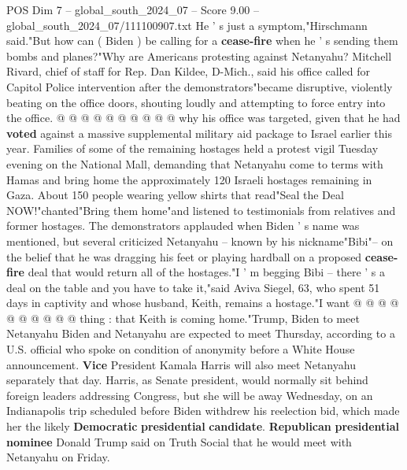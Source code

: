 \begin{textsample}{POS Dim 7 – global\_south\_2024\_07 – Score 9.00 – global\_south\_2024\_07/111100907.txt}
He ' s just a symptom,"Hirschmann said."But how can ( Biden ) be calling for a \textbf{cease-fire} when he ' s sending them bombs and planes?"Why are Americans protesting against Netanyahu?
Mitchell Rivard, chief of staff for Rep.
Dan Kildee, D-Mich., said his office called for Capitol Police intervention after the demonstrators"became disruptive, violently beating on the office doors, shouting loudly and attempting to force entry into the office. @ @ @ @ @ @ @ @ @ @ why his office was targeted, given that he had \textbf{voted} against a massive supplemental military aid package to Israel earlier this year.
Families of some of the remaining hostages held a protest vigil Tuesday evening on the National Mall, demanding that Netanyahu come to terms with Hamas and bring home the approximately 120 Israeli hostages remaining in Gaza.
About 150 people wearing yellow shirts that read"Seal the Deal NOW!"chanted"Bring them home"and listened to testimonials from relatives and former hostages.
The demonstrators applauded when Biden ' s name was mentioned, but several criticized Netanyahu -- known by his nickname"Bibi"-- on the belief that he was dragging his feet or playing hardball on a proposed \textbf{cease-fire} deal that would return all of the hostages."I ' m begging Bibi -- there ' s a deal on the table and you have to take it,"said Aviva Siegel, 63, who spent 51 days in captivity and whose husband, Keith, remains a hostage."I want @ @ @ @ @ @ @ @ @ @ thing : that Keith is coming home."Trump, Biden to meet Netanyahu Biden and Netanyahu are expected to meet Thursday, according to a U.S. official who spoke on condition of anonymity before a White House announcement. \textbf{Vice} President Kamala Harris will also meet Netanyahu separately that day.
Harris, as Senate president, would normally sit behind foreign leaders addressing Congress, but she will be away Wednesday, on an Indianapolis trip scheduled before Biden withdrew his reelection bid, which made her the likely \textbf{Democratic} \textbf{presidential} \textbf{candidate}. \textbf{Republican} \textbf{presidential} \textbf{nominee} Donald Trump said on Truth Social that he would meet with Netanyahu on Friday.

\end{textsample}
